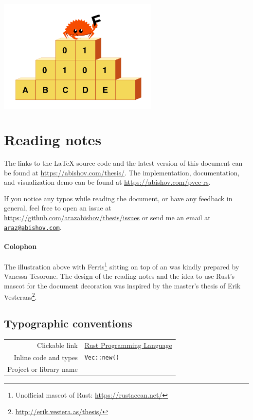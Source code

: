 \thispagestyle{plain}

\begin{center}
    \includegraphics[width=8cm, angle=0, trim=10 10 10 10, clip]{images/ferris-climbing.png}


    \section*{Reading notes}
    \begin{justify}
        The links to the LaTeX source code and the latest version of this document can be found at \url{https://abishov.com/thesis/}. The implementation, documentation, and visualization demo can be found at \url{https://abishov.com/pvec-rs}.

        If you notice any typos while reading the document, or have any feedback in general, feel free to open an issue at \url{https://github.com/arazabishov/thesis/issues} or send me an email at \href{mailto:araz@abishov.com}{\nolinkurl{araz@abishov.com}}.

        \paragraph{Colophon}
        The illustration above with Ferris\footnote{Unofficial mascot of Rust: \url{https://rustacean.net/}} sitting on top of an \treerrb{} was kindly prepared by Vanessa Tesorone. The design of the reading notes and the idea to use Rust's mascot for the document decoration was inspired by the master's thesis of Erik Vesteraas\footnote{\url{http://erik.vestera.as/thesis/}}.
    \end{justify}

    \subsection*{Typographic conventions}
    \begin{tabular}{ r l }
        Clickable link & \href{https://www.rust-lang.org/}{Rust Programming Language} \\
        Inline code and types & \texttt{Vec::new()} \\
        Project or library name & \pvecrs{} \\
    \end{tabular}

\end{center}
